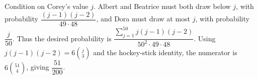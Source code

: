 Condition on Corey's value $ j $. Albert and Beatrice must both draw below $ j $, with probability $\dfrac{(j-1)(j-2)}{49\cdot48}$, and Dora must draw at most $ j $, with probability $\dfrac{j}{50}$. Thus the desired probability is $\dfrac{\sum_{j=1}^{50}j(j-1)(j-2)}{50^2\cdot49\cdot48}$. Using $ j(j-1)(j-2)=6\binom j3 $ and the hockey-stick identity, the numerator is $ 6\binom{51}{4}$, giving $\boxed{\dfrac{51}{200}}$.
